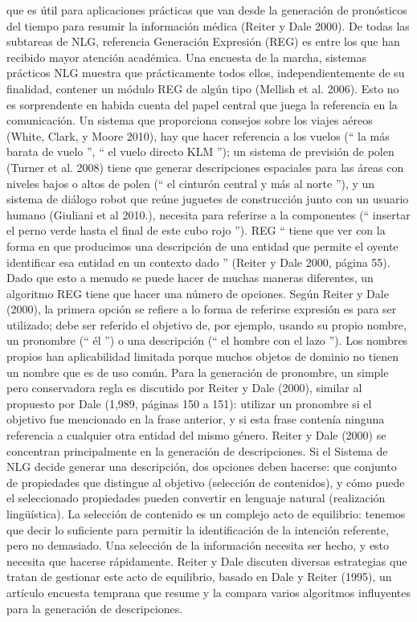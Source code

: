 que es \'util para aplicaciones pr\'acticas
que van desde la generaci\'on de pron\'osticos del tiempo para resumir la informaci\'on m\'edica (Reiter
y Dale 2000). De todas las subtareas de NLG, referencia Generaci\'on Expresi\'on (REG) es
entre los que han recibido mayor atenci\'on acad\'emica. Una encuesta de la marcha,
sistemas pr\'acticos NLG muestra que pr\'acticamente todos ellos, independientemente de su finalidad,
contener un m\'odulo REG de alg\'un tipo (Mellish et al. 2006). Esto no es sorprendente en
habida cuenta del papel central que juega la referencia en la comunicaci\'on. Un sistema que proporciona
consejos sobre los viajes a\'ereos (White, Clark, y Moore 2010), hay que hacer referencia a los vuelos (`` la
m\'as barata de vuelo '', `` el vuelo directo KLM ''); un sistema de previsi\'on de polen (Turner et al.
2008) tiene que generar descripciones espaciales para las \'areas con niveles bajos o altos de polen
(`` el cintur\'on central y m\'as al norte ''), y un sistema de di\'alogo robot que re\'une
juguetes de construcci\'on junto con un usuario humano (Giuliani et al 2010.), necesita para referirse a la
componentes (`` insertar el perno verde hasta el final de este cubo rojo '').
REG `` tiene que ver con la forma en que producimos una descripci\'on de una entidad que permite
el oyente identificar esa entidad en un contexto dado '' (Reiter y Dale 2000, p\'agina 55).
Dado que esto a menudo se puede hacer de muchas maneras diferentes, un algoritmo REG tiene que hacer una
n\'umero de opciones. Seg\'un Reiter y Dale (2000), la primera opci\'on se refiere a lo
forma
de referirse expresi\'on es para ser utilizado; debe ser referido el objetivo de, por ejemplo,
usando su propio nombre, un pronombre (`` \'el '') o una descripci\'on (`` el hombre con el lazo '').
Los nombres propios han aplicabilidad limitada porque muchos objetos de dominio no tienen
un nombre que es de uso com\'un. Para la generaci\'on de pronombre, un simple pero conservadora
regla es discutido por Reiter y Dale (2000), similar al propuesto por Dale (1,989,
p\'aginas 150 a 151): utilizar un pronombre si el objetivo fue mencionado en la frase anterior,
y si esta frase conten\'ia ninguna referencia a cualquier otra entidad del mismo g\'enero.
Reiter y Dale (2000) se concentran principalmente en la generaci\'on de descripciones. Si el
Sistema de NLG decide generar una descripci\'on, dos opciones deben hacerse: que
conjunto de propiedades que distingue al objetivo (selecci\'on de contenidos), y c\'omo puede el seleccionado
propiedades pueden convertir en lenguaje natural (realizaci\'on lingü\'istica). La selecci\'on de contenido es un
complejo acto de equilibrio: tenemos que decir lo suficiente para permitir la identificaci\'on de la intenci\'on
referente, pero no demasiado. Una selecci\'on de la informaci\'on necesita ser hecho, y esto necesita
que hacerse r\'apidamente. Reiter y Dale discuten diversas estrategias que tratan de gestionar este
acto de equilibrio, basado en Dale y Reiter (1995), un art\'iculo encuesta temprana que resume
y la compara varios algoritmos influyentes para la generaci\'on de descripciones.


